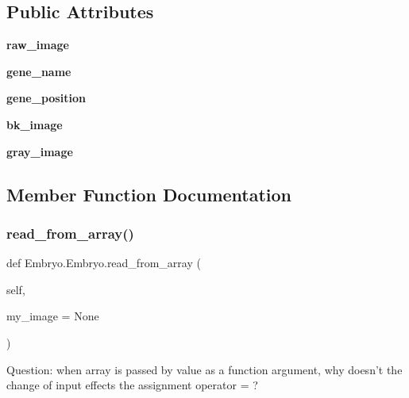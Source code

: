 \subsection*{Public Attributes}
\begin{DoxyCompactItemize}
\item 
\mbox{\label{class_embryo_1_1_embryo_a91c553c150a28b24c4e2fb3284bc7fba}} 
{\bfseries raw\+\_\+image}
\item 
\mbox{\label{class_embryo_1_1_embryo_a652068dd402864f7d3a37ebe1afc81d8}} 
{\bfseries gene\+\_\+name}
\item 
\mbox{\label{class_embryo_1_1_embryo_afc258c5d4ef89412c1444412dedcda1e}} 
{\bfseries gene\+\_\+position}
\item 
\mbox{\label{class_embryo_1_1_embryo_a7a6fd5f49d86ba40f926474f515c7bfc}} 
{\bfseries bk\+\_\+image}
\item 
\mbox{\label{class_embryo_1_1_embryo_ad98d92ab64ef3c9ca265ed319aacfd35}} 
{\bfseries gray\+\_\+image}
\end{DoxyCompactItemize}


\subsection{Member Function Documentation}
\mbox{\label{class_embryo_1_1_embryo_aa568f5ad275a365055f973495d8f9ac6}} 
\subsubsection{\texorpdfstring{read\_from\_array()}{read\_from\_array()}}
{\footnotesize\ttfamily def Embryo.\+Embryo.\+read\+\_\+from\+\_\+array (\begin{DoxyParamCaption}\item[{}]{self,  }\item[{}]{my\+\_\+image = {\ttfamily None} }\end{DoxyParamCaption})}

\begin{DoxyVerb}Question: when array is passed by value as a function argument, 
    why doesn't the change of input effects the assignment operator = ?
\end{DoxyVerb}
 \mbox{\label{class_embryo_1_1_embryo_a208d6fb0e57105830994b09dce283064}} 
